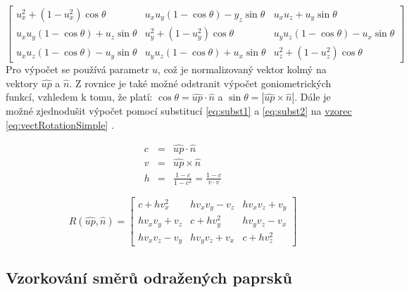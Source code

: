 \documentclass[czech,master,dept460,male,cpp,cpdeclaration]{diploma}
\newcommand{\uvec}[1]{\hat{#1}}
\begin{document}
\begin{equation} \label{eq:vectRotation}
    \begin{bmatrix}
        u_x^2 + \left ( 1 - u_x^2\right ) \cos\theta                & u_x u_y \left ( 1 - \cos \theta \right ) - y_z \sin \theta & u_x u_z + u_y \sin \theta                                  \\
        u_x u_y \left ( 1 -  \cos \theta \right ) + u_z \sin \theta & u_y^2 + \left ( 1 - u_y^2\right ) \cos\theta               & u_y u_z \left ( 1 - \cos \theta \right ) - u_x \sin \theta \\
        u_x u_z \left ( 1 - \cos \theta \right ) - u_y \sin \theta  & u_y u_z \left ( 1 - \cos \theta \right ) + u_x \sin \theta & u_z^2 + \left ( 1 - u_z^2\right ) \cos\theta
    \end{bmatrix}
\end{equation}
Pro výpočet se používá parametr $u$, což je normalizovaný vektor kolmý na vektory $\uvec{up}$ a $\uvec{n}$. Z rovnice je také možné odstranit výpočet goniometrických funkcí, vzhledem k tomu, že platí: $\cos \theta = \uvec{up} \cdot \uvec{n}$ a $\sin \theta = |\uvec{up} \times \uvec{n}|$. Dále je možné zjednodušit výpočet pomocí substitucí \hyperref[eq:subst1]{\ref{eq:subst1}} a \hyperref[eq:subst2]{\ref{eq:subst2}} na \hyperref[eq:vectRotationSimple]{vzorec \ref{eq:vectRotationSimple}} \cite{MollerHughesVectRotation}.

\begin{eqnarray} \label{eq:subst1}
    c &=& \uvec{up} \cdot \uvec{n} \label{eq:subst1}\\
    v &=& \uvec{up} \times \uvec{n} \nonumber\\
    h &=& \frac{1 - c}{1 - c^2} = \frac{1 - c}{v \cdot v}\label{eq:subst2}
\end{eqnarray}

\begin{equation} \label{eq:vectRotationSimple}
    R\left ( \uvec{up}, \uvec{n} \right) = \begin{bmatrix}
        c + h v_x^2     & h v_x v_y - v_z & h v_x v_z + v_y \\
        h v_x v_y + v_z & c + h v_y^2     & h v_y v_z - v_x \\
        h v_x v_z - v_y & h v_y v_z + v_x & c + h v_z^2
    \end{bmatrix}
\end{equation}
\subsection{Vzorkování směrů odražených paprsků}
\end{document}
